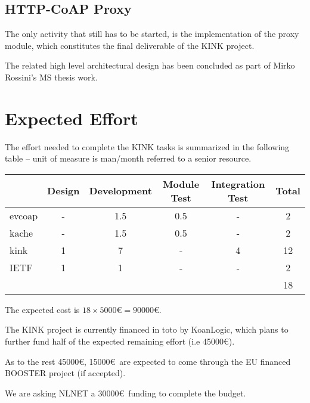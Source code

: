\documentclass[12pt]{article}
\begin{document}
\subsection{HTTP-CoAP Proxy}
The only activity that still has to be started, is the implementation of the proxy module, which constitutes the final deliverable of the KINK project. 

The related high level architectural design has been concluded as part of Mirko Rossini's MS thesis work.

\section{Expected Effort}
The effort needed to complete the KINK tasks is summarized in the following table -- unit of measure is man/month referred to a senior resource.

\begin{center}
\begin{tabular}{|l|c|c|c|c|c|}
	\hline 
	  & Design & Development & Module Test & Integration Test & Total \\
	\hline 
	evcoap & - & 1.5 & 0.5 & - & 2 \\
	\hline
	kache & - & 1.5 & 0.5 & - & 2 \\
	\hline
	kink & 1 & 7 & - & 4 & 12 \\
	\hline
	IETF & 1 & 1 & - & - & 2 \\
	\hline
	\multicolumn{5}{|c|}{} & 18 \\
	\hline
\end{tabular}
\end{center}

The expected cost is $18 \times 5000$\euro $= 90000$\euro. 

The KINK project is currently financed in toto by KoanLogic, which plans to further fund half of the expected remaining effort (i.e 45000\euro).

As to the rest 45000\euro, 15000\euro~are expected to come through the EU financed BOOSTER project (if accepted).

We are asking NLNET a 30000\euro~funding to complete the budget.
\end{document}
